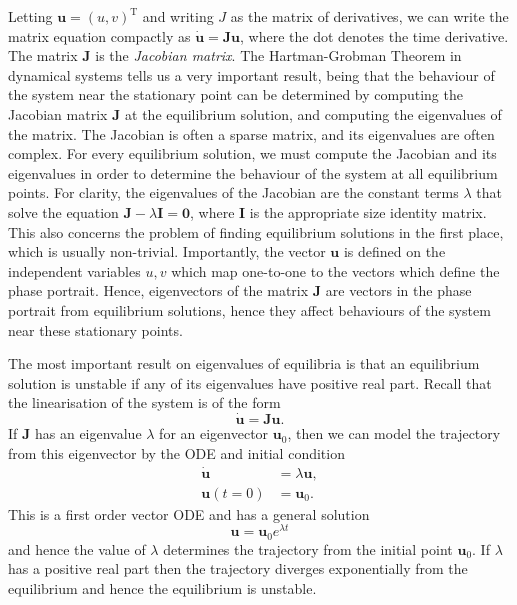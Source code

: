 \documentclass{report}
\begin{document}
Letting \(\mathbf{u} = (u,v)^\mathrm{T}\) and writing \(J\) as the matrix of derivatives,
we can write the matrix equation compactly as \( \dot{\mathbf{u}} = \mathbf{Ju}\), where the dot denotes the time derivative.
The matrix \(\mathbf{J}\) is the \textit{Jacobian matrix}.
The Hartman-Grobman Theorem in dynamical systems tells us a very important result,
being that the behaviour of the system near the stationary point can be determined by computing the Jacobian matrix \(\mathbf{J}\) at the equilibrium solution,
and computing the eigenvalues of the matrix.
The Jacobian is often a sparse matrix, and its eigenvalues are often complex.
For every equilibrium solution, we must compute the Jacobian and its eigenvalues in order to determine the behaviour of the system at all equilibrium points.
For clarity, the eigenvalues of the Jacobian are the constant terms \(\lambda\) that solve the equation \( \mathbf{J} -  \lambda \mathbf{I} = \mathbf{0}\),
where \(\mathbf{I}\) is the appropriate size identity matrix.
This also concerns the problem of finding equilibrium solutions in the first place, which is usually non-trivial.
Importantly, the vector $\mathbf{u}$ is defined on the independent variables $u,v$ which map one-to-one to the vectors which define the phase portrait.
Hence, eigenvectors of the matrix $\mathbf{J}$ are vectors in the phase portrait from equilibrium solutions,
hence they affect behaviours of the system near these stationary points.

The most important result on eigenvalues of equilibria is that an equilibrium solution is unstable if any of its eigenvalues have positive real part.
Recall that the linearisation of the system is of the form
\begin{equation}
	\dot{\mathbf{u}} = \mathbf{Ju}.
\end{equation}
If $\mathbf{J}$ has an eigenvalue $\lambda$ for an eigenvector $\mathbf{u}_0$,
then we can model the trajectory from this eigenvector by the ODE and initial condition
\begin{equation*}
	\begin{aligned}
		\dot{\mathbf{u}} &= \lambda \mathbf{u}, \\
		\mathbf{u}(t=0) &= \mathbf{u}_0.
	\end{aligned}
\end{equation*}
This is a first order vector ODE and has a general solution
\begin{equation}
	\mathbf{u} = \mathbf{u}_0 e^{\lambda t}
\end{equation}
and hence the value of $\lambda$ determines the trajectory from the initial point $\mathbf{u}_0$.
If $\lambda$ has a positive real part then the trajectory diverges exponentially from the equilibrium and hence the equilibrium is unstable.
\end{document}
